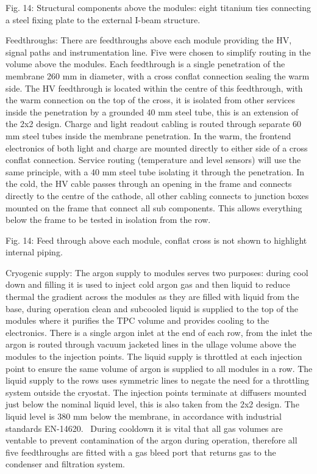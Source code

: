 Fig. 14: Structural components above the modules: eight titanium ties connecting a steel fixing plate to the external I-beam structure.

Feedthroughs: There are feedthroughs above each module providing the HV, signal paths and instrumentation line. Five were chosen to simplify routing in the volume above the modules. Each feedthrough is a single penetration of the membrane 260 mm in diameter, with a cross conflat connection sealing the warm side. The HV feedthrough is located within the centre of this feedthrough, with the warm connection on the top of the cross, it is isolated from other services inside the penetration by a grounded 40 mm steel tube, this is an extension of the 2x2 design. Charge and light readout cabling is routed through separate 60 mm steel tubes inside the membrane penetration. In the warm, the frontend electronics of both light and charge are mounted directly to either side of a cross conflat connection. Service routing (temperature and level sensors) will use the same principle, with a 40 mm steel tube isolating it through the penetration. In the cold, the HV cable passes through an opening in the frame and connects directly to the centre of the cathode, all other cabling connects to junction boxes mounted on the frame that connect all sub components. This allows everything below the frame to be tested in isolation from the row.

Fig. 14: Feed through above each module, conflat cross is not shown to highlight internal piping.

Cryogenic supply: The argon supply to modules serves two purposes: during cool down and filling it is used to inject cold argon gas and then liquid to reduce thermal the gradient across the modules as they are filled with liquid from the base, during operation clean and subcooled liquid is supplied to the top of the modules where it purifies the TPC volume and provides cooling to the electronics. There is a single argon inlet at the end of each row, from the inlet the argon is routed through vacuum jacketed lines in the ullage volume above the modules to the injection points. The liquid supply is throttled at each injection point to ensure the same volume of argon is supplied to all modules in a row. The liquid supply to the rows uses symmetric lines to negate the need for a throttling system outside the cryostat. The injection points terminate at diffusers mounted just below the nominal liquid level, this is also taken from the 2x2 design. The liquid level is 380 mm below the membrane, in accordance with industrial standards EN-14620.  During cooldown it is vital that all gas volumes are ventable to prevent contamination of the argon during operation, therefore all five feedthroughs are fitted with a gas bleed port that returns gas to the condenser and filtration system.

